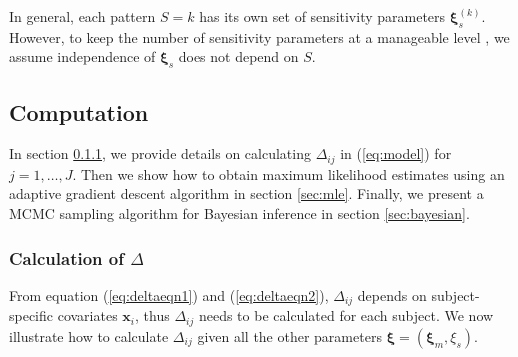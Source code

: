\documentclass[12pt]{article}
\begin{document}
In general, each pattern $S = k$ has its own set of sensitivity
parameters $\bm \xi_s^{(k)}$. However, to keep the number of
sensitivity parameters at a manageable level \citep{dh2008}, we assume
independence of $\bm \xi_s$ does not depend on $S$.

\subsection{Computation}
\label{sec:computation}

In section \ref{sec:deltacal}, we provide details on calculating
$\Delta_{ij}$ in (\ref{eq:model}) for $j = 1, \ldots, J$. Then we
show how to obtain maximum likelihood estimates using an adaptive
gradient descent algorithm in section \ref{sec:mle}. Finally, we
present a MCMC sampling algorithm for Bayesian inference in section
\ref{sec:bayesian}.

\subsubsection{Calculation of $\Delta$ }
\label{sec:deltacal}
From equation (\ref{eq:deltaeqn1}) and (\ref{eq:deltaeqn2}),
$\Delta_{ij}$ depends on subject-specific covariates $\bm x_i$, thus
$\Delta_{ij}$ needs to be calculated for each subject. We now
illustrate how to calculate $\Delta_{ij}$ given all the other
parameters $\bm \xi = (\bm \xi_m, \xi_s)$.
\end{document}

